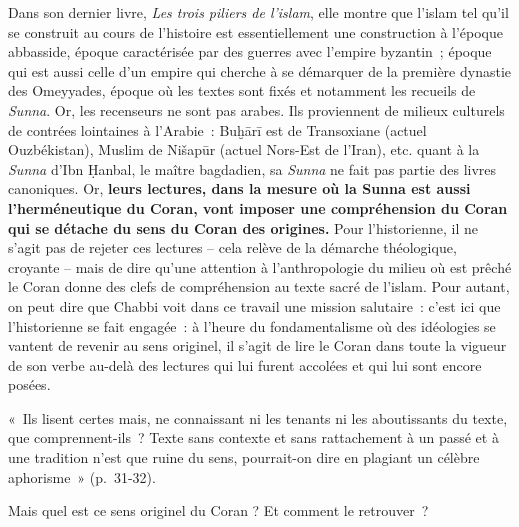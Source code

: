 Dans son dernier livre, \emph{Les trois piliers de l'islam}, elle montre
que l'islam tel qu'il se construit au cours de l'histoire est
essentiellement une construction à l'époque abbasside, époque
caractérisée par des guerres avec l'empire byzantin~; époque qui est
aussi celle d'un empire qui cherche à se démarquer de la première
dynastie des Omeyyades, époque où les textes sont fixés et notamment les
recueils de \emph{Sunna}. Or, les recenseurs ne sont pas arabes. Ils
proviennent de milieux culturels de contrées lointaines à l'Arabie~:
Buḫārī est de Transoxiane (actuel Ouzbékistan), Muslim de Nišapūr
(actuel Nors-Est de l'Iran), etc. quant à la \emph{Sunna} d'Ibn Ḥanbal,
le maître bagdadien, sa \emph{Sunna} ne fait pas partie des livres
canoniques. Or, \textbf{leurs lectures, dans la
mesure où la Sunna est aussi l'herméneutique du Coran, vont imposer une
compréhension du Coran qui se détache du sens du Coran des origines.}
Pour l'historienne, il ne s'agit pas de rejeter ces lectures -- cela
relève de la démarche théologique, croyante -- mais de dire qu'une
attention à l'anthropologie du milieu où est prêché le Coran donne des
clefs de compréhension au texte sacré de l'islam. Pour autant, on peut
dire que Chabbi voit dans ce travail une mission salutaire~: c'est ici
que l'historienne se fait engagée~: à l'heure du fondamentalisme où des
idéologies se vantent de revenir au sens originel, il s'agit de lire le
Coran dans toute la vigueur de son verbe au-delà des lectures qui lui
furent accolées et qui lui sont encore posées.

«~Ils lisent certes mais, ne connaissant ni les tenants ni les
aboutissants du texte, que comprennent-ils~? Texte sans contexte et sans
rattachement à un passé et à une tradition n'est que ruine du sens,
pourrait-on dire en plagiant un célèbre aphorisme~» (p.~31-32).

Mais quel est ce sens originel du Coran ? Et comment le retrouver~?

